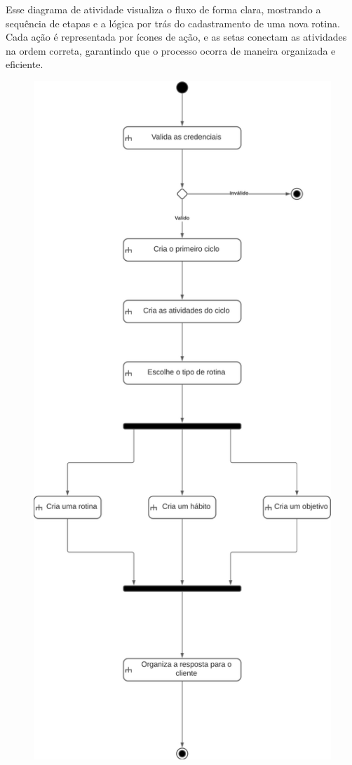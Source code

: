 \newpage
Esse diagrama de atividade visualiza o fluxo de forma clara, mostrando a sequência
de etapas e a lógica por trás do cadastramento de uma nova rotina. Cada ação é representada
por ícones de ação, e as setas conectam as atividades na ordem correta, garantindo
que o processo ocorra de maneira organizada e eficiente.

\begin{figure}[h]
  \centering
  \includegraphics[scale=0.5]{images/diagrams/activity-two.png}
\end{figure}

